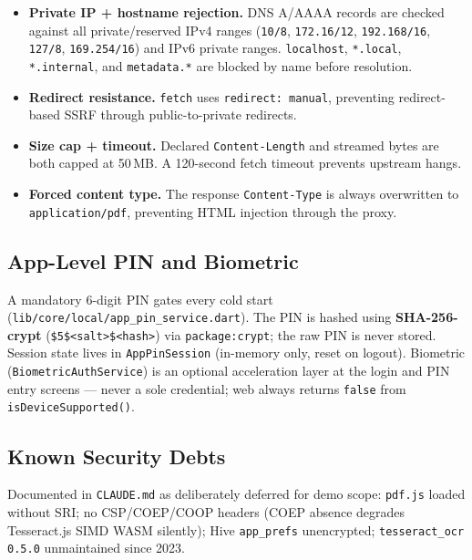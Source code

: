 \documentclass[11pt,a4paper]{article}
\begin{document}
\begin{itemize}
  \item \textbf{Private IP + hostname rejection.} DNS A/AAAA records are checked against
    all private/reserved IPv4 ranges (\texttt{10/8}, \texttt{172.16/12},
    \texttt{192.168/16}, \texttt{127/8}, \texttt{169.254/16}) and IPv6 private ranges.
    \texttt{localhost}, \texttt{*.local}, \texttt{*.internal}, and \texttt{metadata.*} are
    blocked by name before resolution.
  \item \textbf{Redirect resistance.} \texttt{fetch} uses \texttt{redirect: manual},
    preventing redirect-based SSRF through public-to-private redirects.
  \item \textbf{Size cap + timeout.} Declared \texttt{Content-Length} and streamed bytes
    are both capped at 50\,MB. A 120-second fetch timeout prevents upstream hangs.
  \item \textbf{Forced content type.} The response \texttt{Content-Type} is always
    overwritten to \texttt{application/pdf}, preventing HTML injection through the proxy.
\end{itemize}

\subsection{App-Level PIN and Biometric}

A mandatory 6-digit PIN gates every cold start
(\texttt{lib/core/local/app\_pin\_service.dart}). The PIN is hashed using
\textbf{SHA-256-crypt} (\texttt{\$5\$<salt>\$<hash>}) via \texttt{package:crypt}; the
raw PIN is never stored. Session state lives in \texttt{AppPinSession} (in-memory only,
reset on logout). Biometric (\texttt{BiometricAuthService}) is an optional acceleration
layer at the login and PIN entry screens — never a sole credential; web always returns
\texttt{false} from \texttt{isDeviceSupported()}.

\subsection{Known Security Debts}

Documented in \texttt{CLAUDE.md} as deliberately deferred for demo scope:
\texttt{pdf.js} loaded without SRI; no CSP/COEP/COOP headers (COEP absence
degrades Tesseract.js SIMD WASM silently); Hive \texttt{app\_prefs} unencrypted;
\texttt{tesseract\_ocr 0.5.0} unmaintained since 2023.

\end{document}
